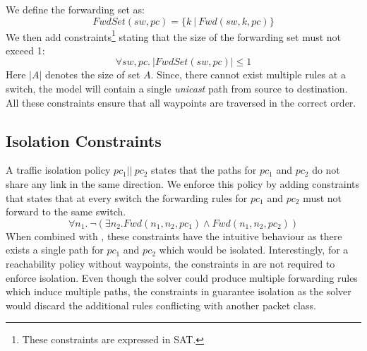 We define the forwarding set as:
\begin{equation}
	FwdSet(sw,pc) = \{k \ | \ Fwd(sw,k,pc)\}
\end{equation}
We then add constraints\footnote{
	These constraints are expressed in SAT.} stating that the size of the forwarding set must not exceed 1:
\begin{equation}
		\forall sw,pc .\ |FwdSet(sw,pc)| \leq 1 \label{eq:fwdset}
\end{equation}
Here $|A|$ denotes the size of set $A$. 
Since, there cannot exist multiple rules at a switch, the model will contain a 
single {\em unicast} path from source to destination. 
All these constraints ensure that all waypoints are traversed in the correct order. 

\subsection{Isolation Constraints}
A traffic isolation policy $pc_1 || \ pc_2$ states that the paths for
$pc_1$ and $pc_2$ do not share any link in the same direction.  We
enforce this policy by adding constraints that states that at every
switch the forwarding rules for $pc_1$ and $pc_2$ must not forward to
the same switch.
\begin{equation}
	\forall n_1.~\neg ( \exists n_2. Fwd(n_1,n_2,pc_1) \wedge Fwd(n_1,n_2,pc_2)) \label{eq:isolation}
\end{equation}
When combined with , these constraints have the intuitive behaviour 
as there exists a single path for $pc_1$ and
$pc_2$ which would be isolated. 
Interestingly, for a reachability policy without waypoints,  
the constraints in  are not required to enforce isolation. 
Even though the solver could produce multiple forwarding rules which induce multiple paths, 
the constraints in  guarantee isolation as the solver would discard
the additional rules conflicting with another packet class.


